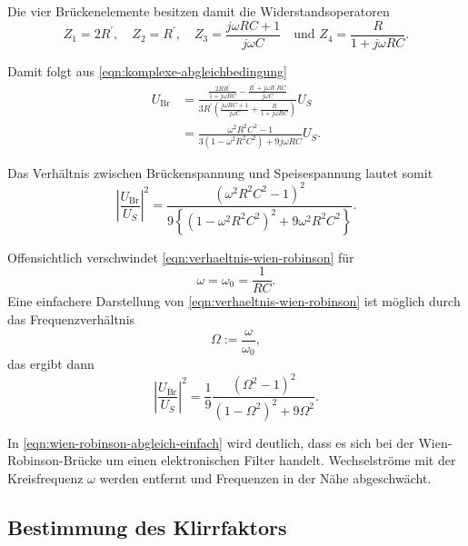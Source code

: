 Die vier Brückenelemente besitzen damit die Widerstandsoperatoren
\begin{equation}
	Z_1 = 2R^\prime,
	\quad
	Z_2 = R^\prime,
	\quad
	Z_3 = \frac{j\omega RC + 1}{j \omega C}
	\quad
	\text{und }
	Z_4 = \frac{R}{1 + j\omega RC}.
\end{equation}

Damit folgt aus \autoref{eqn:komplexe-abgleichbedingung}
\begin{align}
	U_\text{Br} 
	&= \frac{
		\frac{2 R R^\prime}{1 + j\omega RC}
		- \frac{R^\prime + j \omega R^\prime RC}{j\omega C}
	}
	{3 R^\prime \left(\frac{j \omega RC +1}{j\omega C}
			+ \frac{R}{1 + j \omega RC}
		\right)
	}
	U_S
	\\
	&= \frac{\omega^2 R^2 C^2 - 1}
	{3 \left(1 - \omega^2 R^2C^2\right) + 9 j\omega RC}
	U_S.
\end{align}

Das Verhältnis zwischen Brückenspannung und Speisespannung lautet somit
\begin{equation}
	\left|\frac{U_\text{Br}}{U_S}\right|^2
	=
	\frac{\left(\omega^2R^2C^2 - 1 \right)^2}
	{9 \left\{ \left(1 - \omega^2R^2C^2\right)^2 + 9\omega^2R^2C^2 \right\}}.
	\label{eqn:verhaeltnis-wien-robinson}
\end{equation}

Offensichtlich verschwindet \autoref{eqn:verhaeltnis-wien-robinson} für
\begin{equation}
	\omega = \omega_0 = \frac{1}{RC}.
	\label{eqn:wien-robinson-w0}
\end{equation}
Eine einfachere Darstellung von \autoref{eqn:verhaeltnis-wien-robinson} ist möglich durch
das Frequenzverhältnis
\begin{equation}
	\Omega := \frac{\omega}{\omega_0},
	\label{eqn:wien-robinson-frequenz}
\end{equation}
das ergibt dann
\begin{equation}
	\left|\frac{U_\text{Br}}{U_S}\right|^2
	=
	\frac{1}{9}
	\frac{\left(\Omega^2 - 1\right)^2}{\left(1 - \Omega^2\right)^2 + 9\Omega^2}.
	\label{eqn:wien-robinson-abgleich-einfach}
\end{equation}

In \autoref{eqn:wien-robinson-abgleich-einfach} wird deutlich, dass es sich bei der 
Wien-Robinson-Brücke um einen elektronischen Filter handelt. Wechselströme mit der 
Kreisfrequenz $\omega$ werden entfernt und Frequenzen in der Nähe abgeschwächt.

\subsection{Bestimmung des Klirrfaktors}
\label{sec:klirrfaktor}

